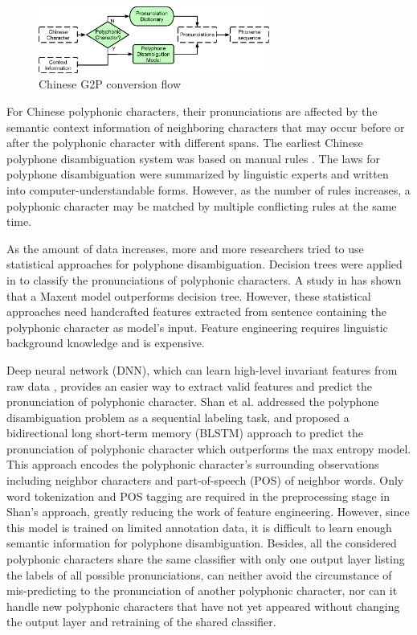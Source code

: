 \documentclass[a4paper]{article}
\begin{document}
\begin{figure}[t]
	
	\begin{minipage}[b]{1.0\linewidth}
		\centerline{\includegraphics[width=7.6cm]{pics3/ChineseG2P.eps}}
	\end{minipage}
	\caption{Chinese G2P conversion flow}
	\label{fig:chineseG2P}
\end{figure}

For Chinese polyphonic characters, their pronunciations are affected by the semantic context information \cite{lilinhui2010} of neighboring characters that may occur before or after the polyphonic character with different spans. The earliest Chinese polyphone disambiguation system was based on manual rules \cite{dajunzhang2000, lianhongcai1995}. The laws for polyphone disambiguation were summarized by linguistic experts  and written into computer-understandable forms. However, as the number of rules increases, a polyphonic character may be matched by multiple conflicting rules at the same time.

As the amount of data increases, more and more researchers tried to use statistical approaches for polyphone disambiguation. Decision trees were applied in \cite{wang1996broad} to classify the pronunciations of polyphonic characters. A study in \cite{fangzhouliu2007} has shown that a Maxent model outperforms decision tree. However, these statistical approaches need handcrafted features extracted from sentence containing the polyphonic character as model's input. Feature engineering requires linguistic background knowledge and is expensive.

Deep neural network (DNN), which can learn high-level invariant features from raw data \cite{bengio2013representation}, provides an easier way to extract valid features and predict the pronunciation of polyphonic character. Shan et al. \cite{shan2016bi} addressed the polyphone disambiguation problem as a sequential labeling task, and proposed a bidirectional long short-term memory (BLSTM) approach to predict the pronunciation of polyphonic character which outperforms the max entropy model. This approach encodes the polyphonic character’s surrounding observations including neighbor characters and part-of-speech (POS) of neighbor words. Only word tokenization and POS tagging are required in the preprocessing stage in Shan's approach, greatly reducing the work of feature engineering. However, since this model is trained on limited annotation data, it is difficult to learn enough semantic information for polyphone disambiguation. Besides, all the considered polyphonic characters share the same classifier with only one output layer listing the labels of all possible pronunciations, can neither avoid the circumstance of mis-predicting to the pronunciation of another polyphonic character, nor can it handle new polyphonic characters that have not yet appeared without changing the output layer and retraining of the shared classifier.
\end{document}
